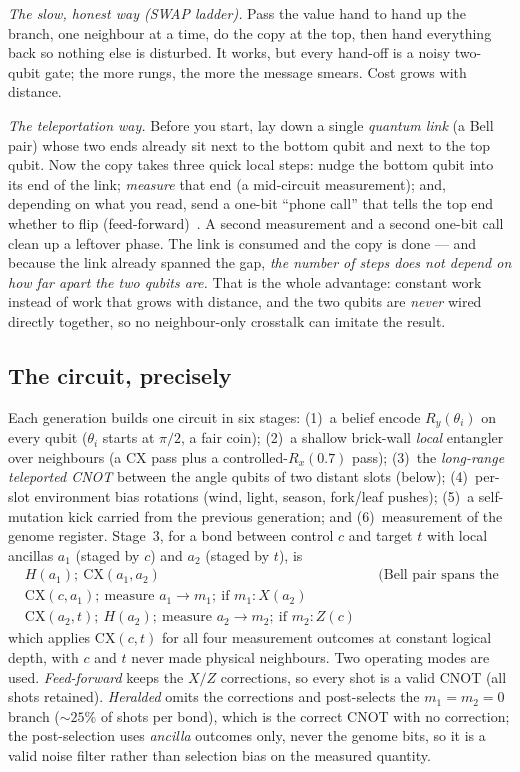\documentclass[conference]{IEEEtran}
\begin{document}
\emph{The slow, honest way (SWAP ladder).} Pass the value hand to hand up the branch, one
neighbour at a time, do the copy at the top, then hand everything back so nothing else is
disturbed. It works, but every hand-off is a noisy two-qubit gate; the more rungs, the more
the message smears. Cost grows with distance.

\emph{The teleportation way.} Before you start, lay down a single \emph{quantum link} (a
Bell pair) whose two ends already sit next to the bottom qubit and next to the top qubit.
Now the copy takes three quick local steps: nudge the bottom qubit into its end of the
link; \emph{measure} that end (a mid-circuit measurement); and, depending on what you read,
send a one-bit ``phone call'' that tells the top end whether to flip
(feed-forward)~\cite{gottesman1999}. A second measurement and a second one-bit call clean
up a leftover phase. The link is consumed and the copy is done --- and because the link
already spanned the gap, \emph{the number of steps does not depend on how far apart the two
qubits are.} That is the whole advantage: constant work instead of work that grows with
distance, and the two qubits are \emph{never} wired directly together, so no neighbour-only
crosstalk can imitate the result.

\subsection{The circuit, precisely}

Each generation builds one circuit in six stages: (1)~a belief encode $R_y(\theta_i)$ on
every qubit ($\theta_i$ starts at $\pi/2$, a fair coin); (2)~a shallow brick-wall
\emph{local} entangler over neighbours (a CX pass plus a controlled-$R_x(0.7)$ pass);
(3)~the \emph{long-range teleported CNOT} between the angle qubits of two distant slots
(below); (4)~per-slot environment bias rotations (wind, light, season, fork/leaf pushes);
(5)~a self-mutation kick carried from the previous generation; and (6)~measurement of the
genome register. Stage~3, for a bond between control $c$ and target $t$ with local ancillas
$a_1$ (staged by $c$) and $a_2$ (staged by $t$), is
\begin{equation}
\begin{aligned}
&H(a_1);\ \mathrm{CX}(a_1,a_2) &&\text{(Bell pair spans the gap)}\\
&\mathrm{CX}(c,a_1);\ \text{measure } a_1\!\to\! m_1;\ \text{if } m_1\!:X(a_2)\\
&\mathrm{CX}(a_2,t);\ H(a_2);\ \text{measure } a_2\!\to\! m_2;\ \text{if } m_2\!:Z(c)
\end{aligned}
\end{equation}
which applies $\mathrm{CX}(c,t)$ for all four measurement outcomes at constant logical
depth, with $c$ and $t$ never made physical neighbours. Two operating modes are used.
\emph{Feed-forward} keeps the $X/Z$ corrections, so every shot is a valid CNOT (all shots
retained). \emph{Heralded} omits the corrections and post-selects the $m_1{=}m_2{=}0$
branch (${\sim}25\%$ of shots per bond), which is the correct CNOT with no correction; the
post-selection uses \emph{ancilla} outcomes only, never the genome bits, so it is a valid
noise filter rather than selection bias on the measured quantity.
\end{document}
